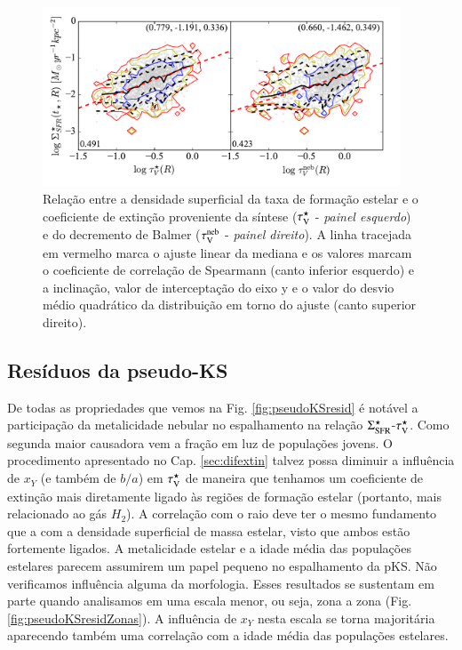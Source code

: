 \begin{figure}
	\centering
	\includegraphics[width=0.95\textwidth]{figuras/pseudoKS.pdf}
	\caption[Nossa {\em pseudo-KS}.]
	{Relação entre a densidade superficial da taxa de formação estelar e o coeficiente de extinção
proveniente da síntese ($\tau_{\mathrm{V}}^\star$ - {\em painel esquerdo}) e do decremento de Balmer ($\tau_{\mathrm{V}}^{\mathrm{neb}}$ -
{\em painel direito}). A linha tracejada em vermelho marca o ajuste linear da mediana e os
valores marcam o coeficiente de correlação de Spearmann (canto inferior esquerdo) e a
inclinação, valor de interceptação do eixo y e o valor do desvio médio quadrático da distribuição em
torno do ajuste (canto superior direito).}
	\label{fig:pseudoKS}
\end{figure}

\subsection{Resíduos da pseudo-KS}
\label{sec:gasfrac:KS:resid}
 
De todas as propriedades que vemos na Fig. \ref{fig:pseudoKSresid} é notável a participação da
metalicidade nebular no espalhamento na relação $\Sigma_{\mathrm{SFR}}^\star$-$\tau_{\mathrm{V}}^\star$. Como segunda maior causadora
vem a fração em luz de populações jovens. O procedimento apresentado no Cap. \ref{sec:difextin}
talvez possa diminuir a influência de $x_Y$ (e também de $b/a$) em $\tau_{\mathrm{V}}^\star$ de maneira que tenhamos
um coeficiente de extinção mais diretamente ligado às regiões de formação estelar (portanto, mais
relacionado ao gás $H_2$). A correlação com o raio deve ter o mesmo fundamento que a com a densidade
superficial de massa estelar, visto que ambos estão fortemente ligados. A metalicidade estelar e a
idade média das populações estelares parecem assumirem um papel pequeno no espalhamento da pKS. Não
verificamos influência alguma da morfologia. Esses resultados se sustentam em parte quando
analisamos em uma escala menor, ou seja, zona a zona (Fig. \ref{fig:pseudoKSresidZonas}). A
influência de $x_Y$ nesta escala se torna majoritária aparecendo também uma correlação com a idade
média das populações estelares.

